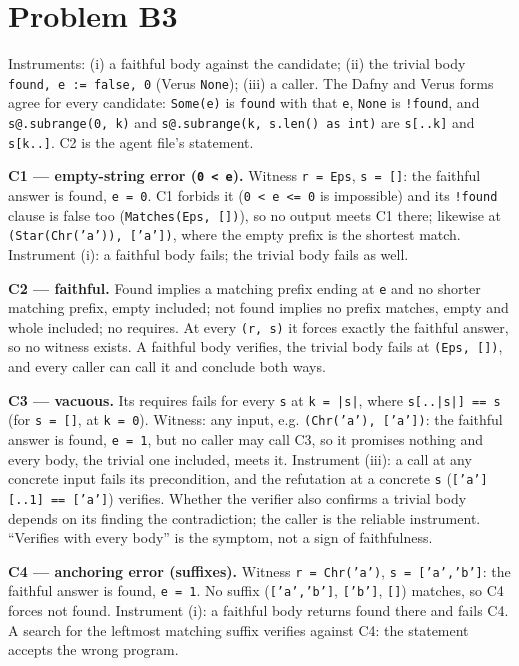 \documentclass[11pt]{article}
\begin{document}
\section*{Problem B3}\label{ans:B3}
\begin{answer}
Instruments: (i) a faithful body against the candidate; (ii) the trivial body
\texttt{found, e := false, 0} (Verus \texttt{None}); (iii) a caller. The Dafny
and Verus forms agree for every candidate: \texttt{Some(e)} is
\texttt{found} with that \texttt{e}, \texttt{None} is \texttt{!found}, and
\texttt{s@.subrange(0, k)} and \texttt{s@.subrange(k, s.len() as int)} are
\texttt{s[..k]} and \texttt{s[k..]}. C2 is the agent file's statement.

\textbf{C1 --- empty-string error (\texttt{0 < e}).} Witness \texttt{r = Eps},
\texttt{s = []}: the faithful answer is found, \texttt{e = 0}. C1 forbids it
(\texttt{0 < e <= 0} is impossible) and its \texttt{!found} clause is false too
(\texttt{Matches(Eps, [])}), so no output meets C1 there; likewise at
\texttt{(Star(Chr('a')), ['a'])}, where the empty prefix is the shortest
match. Instrument (i): a faithful body fails; the trivial body fails as well.

\textbf{C2 --- faithful.} Found implies a matching prefix ending at
\texttt{e} and no shorter matching prefix, empty included; not found implies
no prefix matches, empty and whole included; no requires. At every
\texttt{(r, s)} it forces exactly the faithful answer, so no witness exists. A
faithful body verifies, the trivial body fails at \texttt{(Eps, [])}, and every
caller can call it and conclude both ways.

\textbf{C3 --- vacuous.} Its requires fails for every \texttt{s} at
\texttt{k = |s|}, where \texttt{s[..|s|] == s} (for \texttt{s = []}, at
\texttt{k = 0}). Witness: any input, e.g. \texttt{(Chr('a'), ['a'])}: the
faithful answer is found, \texttt{e = 1}, but no caller may call C3, so it
promises nothing and every body, the trivial one included, meets it.
Instrument (iii): a call at any concrete input fails its precondition, and the
refutation at a concrete \texttt{s} (\texttt{['a'][..1] == ['a']}) verifies.
Whether the verifier also confirms a trivial body depends on its finding the
contradiction; the caller is the reliable instrument. ``Verifies with every
body'' is the symptom, not a sign of faithfulness.

\textbf{C4 --- anchoring error (suffixes).} Witness \texttt{r = Chr('a')},
\texttt{s = ['a','b']}: the faithful answer is found, \texttt{e = 1}. No
suffix (\texttt{['a','b']}, \texttt{['b']}, \texttt{[]}) matches, so C4 forces
not found. Instrument (i): a faithful body returns found there and fails C4. A
search for the leftmost matching suffix verifies against C4: the statement
accepts the wrong program.


\end{answer}
\end{document}

